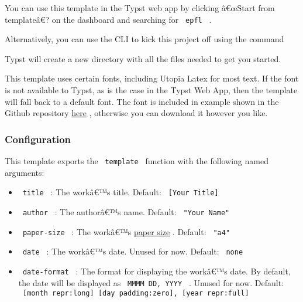 You can use this template in the Typst web app by clicking â€œStart from
templateâ€? on the dashboard and searching for \texttt{\ epfl\ } .

Alternatively, you can use the CLI to kick this project off using the
command

\begin{Shaded}
\begin{Highlighting}[]
\end{Highlighting}
\end{Shaded}

Typst will create a new directory with all the files needed to get you
started.

This template uses certain fonts, including Utopia Latex for most text.
If the font is not available to Typst, as is the case in the Typst Web
App, then the template will fall back to a default font. The font is
included in example shown in the Github repository
\href{https://github.com/augustebaum/epfl-thesis-typst/blob/v0.1.2/example/utopia_font}{here}
, otherwise you can download it however you like.

\subsubsection{Configuration}\label{configuration}

This template exports the \texttt{\ template\ } function with the
following named arguments:

\begin{itemize}
\tightlist
\item
  \texttt{\ title\ } : The workâ€™s title. Default:
  \texttt{\ {[}Your\ Title{]}\ }
\item
  \texttt{\ author\ } : The authorâ€™s name. Default:
  \texttt{\ "Your\ Name"\ }
\item
  \texttt{\ paper-size\ } : The workâ€™s
  \href{https://typst.app/docs/reference/layout/page\#parameters-paper}{paper
  size} . Default: \texttt{\ "a4"\ }
\item
  \texttt{\ date\ } : The workâ€™s date. Unused for now. Default:
  \texttt{\ none\ }
\item
  \texttt{\ date-format\ } : The format for displaying the workâ€™s
  date. By default, the date will be displayed as
  \texttt{\ MMMM\ DD,\ YYYY\ } . Unused for now. Default:
  \texttt{\ {[}month\ repr:long{]}\ {[}day\ padding:zero{]},\ {[}year\ repr:full{]}\ }
\end{itemize}


